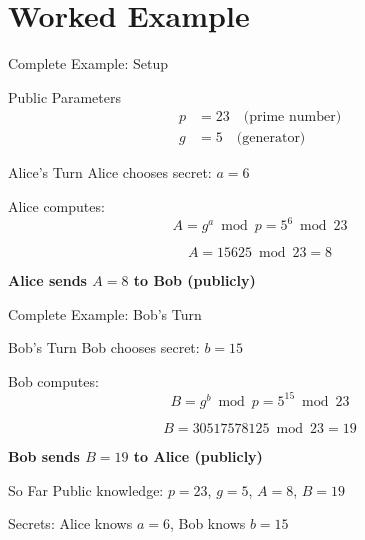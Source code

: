 \documentclass{beamer}
\begin{document}
\section{Worked Example}

\begin{frame}{Complete Example: Setup}
\begin{block}{Public Parameters}
\begin{align*}
p &= 23 \quad \text{(prime number)} \\
g &= 5 \quad \text{(generator)}
\end{align*}
\end{block}

\pause

\begin{block}{Alice's Turn}
Alice chooses secret: $a = 6$

Alice computes:
\[
A = g^a \bmod p = 5^6 \bmod 23
\]

\pause

\[
A = 15625 \bmod 23 = 8
\]

\textbf{Alice sends $A = 8$ to Bob (publicly)}
\end{block}
\end{frame}

\begin{frame}{Complete Example: Bob's Turn}
\begin{block}{Bob's Turn}
Bob chooses secret: $b = 15$

Bob computes:
\[
B = g^b \bmod p = 5^{15} \bmod 23
\]

\pause

\[
B = 30517578125 \bmod 23 = 19
\]

\textbf{Bob sends $B = 19$ to Alice (publicly)}
\end{block}

\pause

\begin{alertblock}{So Far}
Public knowledge: $p = 23$, $g = 5$, $A = 8$, $B = 19$

Secrets: Alice knows $a = 6$, Bob knows $b = 15$
\end{alertblock}
\end{frame}
\end{document}

